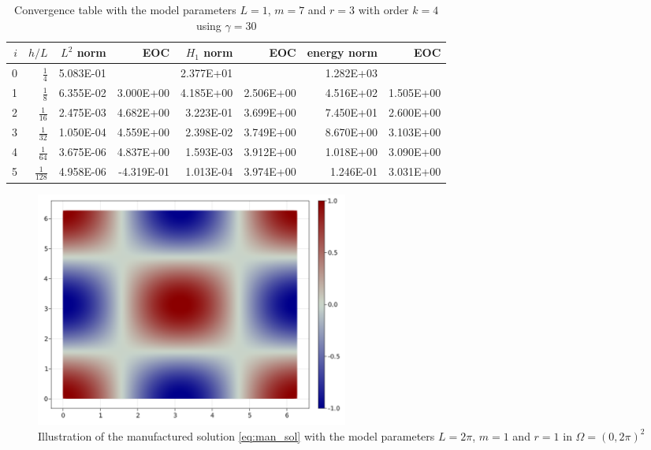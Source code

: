 \begin{table}
  \caption{\label{tab:ex1_order:c}Convergence table with the model parameters $L=1$, $m=7$ and $r=3$ with order $k=4$ using $ \gamma = 30$ }
  \begin{tabular}{rrrrrrrr}
    \hline\hline
    $i$&\textbf{$h/{L} $} & \textbf{$L^2$ norm} & \textbf{EOC} & \textbf{$H_1$ norm} & \textbf{EOC} & \textbf{energy norm} & \textbf{EOC} \\\hline
    0&$\frac{1}{4}$ & 5.083E-01 &  & 2.377E+01 &  & 1.282E+03 &  \\
    1&$\frac{1}{8}$ & 6.355E-02 & 3.000E+00 & 4.185E+00 & 2.506E+00 & 4.516E+02 & 1.505E+00 \\
    2&$\frac{1}{16}$ & 2.475E-03 & 4.682E+00 & 3.223E-01 & 3.699E+00 & 7.450E+01 & 2.600E+00 \\
    3&$\frac{1}{32}$ & 1.050E-04 & 4.559E+00 & 2.398E-02 & 3.749E+00 & 8.670E+00 & 3.103E+00 \\
    4&$\frac{1}{64}$ & 3.675E-06 & 4.837E+00 & 1.593E-03 & 3.912E+00 & 1.018E+00 & 3.090E+00 \\
    5&$\frac{1}{128}$ & 4.958E-06 & -4.319E-01 & 1.013E-04 & 3.974E+00 & 1.246E-01 & 3.031E+00 \\\hline\hline
  \end{tabular}
\end{table}

\newpage

\begin{figure}[tbh!]
    \centering
    \includegraphics[width=0.5\textwidth]{figures/model/l_6.28_m_1_r_1n_100_sol.png}
    \caption{Illustration of the manufactured solution \eqref{eq:man_sol} with the model parameters $L=2\pi$, $m=1$ and $r=1$ in $\Omega = (0,2\pi)^2$}
    \label{fig:sol_l2pi_m1_r1}
\end{figure}


